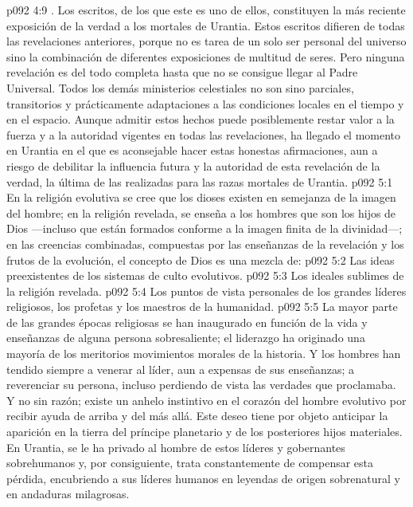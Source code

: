 \vs p092 4:9 . Los escritos, de los que este es uno de ellos, constituyen la más reciente exposición de la verdad a los mortales de Urantia. Estos escritos difieren de todas las revelaciones anteriores, porque no es tarea de un solo ser personal del universo sino la combinación de diferentes exposiciones de multitud de seres. Pero ninguna revelación es del todo completa hasta que no se consigue llegar al Padre Universal. Todos los demás ministerios celestiales no son sino parciales, transitorios y prácticamente adaptaciones a las condiciones locales en el tiempo y en el espacio. Aunque admitir estos hechos puede posiblemente restar valor a la fuerza y a la autoridad vigentes en todas las revelaciones, ha llegado el momento en Urantia en el que es aconsejable hacer estas honestas afirmaciones, aun a riesgo de debilitar la influencia futura y la autoridad de esta revelación de la verdad, la última de las realizadas para las razas mortales de Urantia.
\vs p092 5:1 En la religión evolutiva se cree que los dioses existen en semejanza de la imagen del hombre; en la religión revelada, se enseña a los hombres que son los hijos de Dios ---incluso que están formados conforme a la imagen finita de la divinidad---; en las creencias combinadas, compuestas por las enseñanzas de la revelación y los frutos de la evolución, el concepto de Dios es una mezcla de:
\vs p092 5:2 Las ideas preexistentes de los sistemas de culto evolutivos.
\vs p092 5:3 Los ideales sublimes de la religión revelada.
\vs p092 5:4 Los puntos de vista personales de los grandes líderes religiosos, los profetas y los maestros de la humanidad.
\vs p092 5:5 \pc La mayor parte de las grandes épocas religiosas se han inaugurado en función de la vida y enseñanzas de alguna persona sobresaliente; el liderazgo ha originado una mayoría de los meritorios movimientos morales de la historia. Y los hombres han tendido siempre a venerar al líder, aun a expensas de sus enseñanzas; a reverenciar su persona, incluso perdiendo de vista las verdades que proclamaba. Y no sin razón; existe un anhelo instintivo en el corazón del hombre evolutivo por recibir ayuda de arriba y del más allá. Este deseo tiene por objeto anticipar la aparición en la tierra del príncipe planetario y de los posteriores hijos materiales. En Urantia, se le ha privado al hombre de estos líderes y gobernantes sobrehumanos y, por consiguiente, trata constantemente de compensar esta pérdida, encubriendo a sus líderes humanos en leyendas de origen sobrenatural y en andaduras milagrosas.
